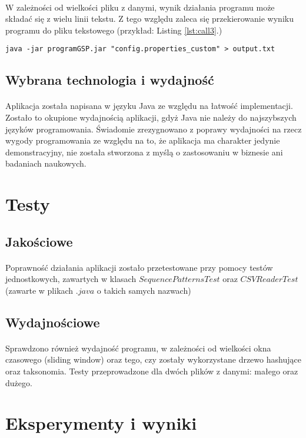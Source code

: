 \documentclass[11pt,a4paper]{article}
\begin{document}
\paragraph{} W zależności od wielkości pliku z danymi, wynik działania programu może składać się z wielu linii tekstu. Z tego względu zaleca się przekierowanie wyniku programu do pliku tekstowego (przykład: Listing \ref{lst:call3}.)
\begin{lstlisting}[caption={Wywołanie dla domyślnego pliku konfiguracyjnego},label={lst:call3}]
java -jar programGSP.jar "config.properties_custom" > output.txt
\end{lstlisting}
\subsection{Wybrana technologia i wydajność}
\paragraph{} Aplikacja została napisana w języku Java ze względu na łatwość implementacji. Zostało to okupione wydajnością aplikacji, gdyż Java nie należy do najszybszych języków programowania. Świadomie zrezygnowano z poprawy wydajności na rzecz wygody programowania ze względu na to, że aplikacja ma charakter jedynie demonstracyjny, nie została stworzona z myślą o zastosowaniu w biznesie ani badaniach naukowych.

\section{Testy}
\subsection{Jakościowe}
\paragraph{} Poprawność działania aplikacji zostało przetestowane przy pomocy testów jednostkowych, zawartych w klasach $SequencePatternsTest$ oraz $CSVReaderTest$ (zawarte w plikach $.java$ o takich samych nazwach)
\subsection{Wydajnościowe}
\paragraph{} Sprawdzono również wydajność programu, w zależności od wielkości okna czasowego (sliding window) oraz tego, czy zostały wykorzystane drzewo hashujące oraz taksonomia. Testy przeprowadzone dla dwóch plików z danymi: małego oraz dużego.

\section{Eksperymenty i wyniki}
\nocite{*}


\end{document}
